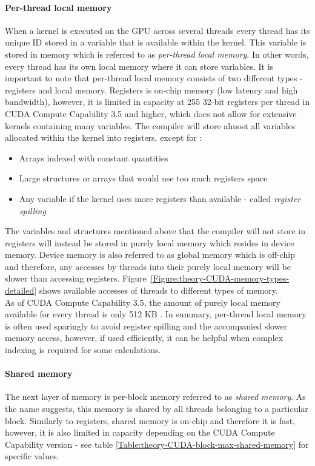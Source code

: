 \paragraph{Per-thread local memory}
When a kernel is executed on the GPU across several threads every thread has its unique ID stored in a variable that is available within the kernel. This variable is stored in memory which is referred to as \textit{per-thread local memory}. In other words, every thread has its own local memory where it can store variables. It is important to note that per-thread local memory consists of two different types - registers and local memory. Registers is on-chip memory (low latency and high bandwidth), however, it is limited in capacity at 255 32-bit registers per thread in CUDA Compute Capability 3.5 and higher, which does not allow for extensive kernels containing many variables. The compiler will store almost all variables allocated within the kernel into registers, except for \cite{NVIDIAMay2022}:
\begin{itemize}
	\item Arrays indexed with constant quantities
	\item Large structures or arrays that would use too much registers space
	\item Any variable if the kernel uses more registers than available - called \textit{register spilling}
\end{itemize}
The variables and structures mentioned above that the compiler will not store in registers will instead be stored in purely local memory which resides in device memory. Device memory is also referred to as global memory which is off-chip and therefore, any accesses by threads into their purely local memory will be slower than accessing registers. Figure~\ref{Figure:theory-CUDA-memory-types-detailed} shows available accesses of threads to different types of memory. \\
As of CUDA Compute Capability 3.5, the amount of purely local memory available for every thread is only 512 KB \cite{NVIDIAMay2022}. In summary, per-thread local memory is often used sparingly to avoid register spilling and the accompanied slower memory access, however, if used efficiently, it can be helpful when complex indexing is required for some calculations.

\paragraph{Shared memory}\label{Paragraph:theory-CUDA-memory-management-shared-memory}
The next layer of memory is per-block memory referred to as \textit{shared memory}. As the name suggests, this memory is shared by all threads belonging to a particular block. Similarly to registers, shared memory is on-chip and therefore it is fast, however, it is also limited in capacity depending on the CUDA Compute Capability version - see table \ref{Table:theory-CUDA-block-max-shared-memory} for specific values.

